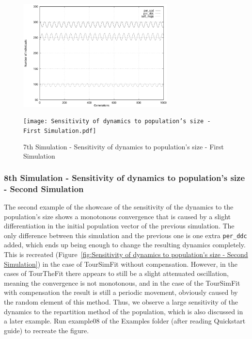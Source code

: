 	\begin{figure}[h]
	    \centering
		\includegraphics[width=0.7\textwidth]{RefPaperFigures/fig7a.jpeg}\par\vspace{0.5em}
	    \texttt{[image: Sensitivity of dynamics to population's size - First Simulation.pdf]}
	    \caption{7th Simulation - Sensitivity of dynamics to population's size - First Simulation}
	    \label{fig:Sensitivity of dynamics to population's size - First Simulation}
	\end{figure}
\subsubsection{8th Simulation - Sensitivity of dynamics to population's size - Second Simulation}
The second example of the showcase of the sensitivity of the dynamics to the population's size shows a monotonous convergence that is caused by a slight differentiation in the initial population vector of the previous simulation. The only difference between this simulation and the previous one is one extra \texttt{per\_ddc} added, which ends up being enough to change the resulting dynamics completely. This is recreated (Figure~\ref{fig:Sensitivity of dynamics to population's size - Second Simulation}) in the case of TourSimFit without compensation. However, in the cases of TourTheFit there appears to still be a slight attenuated oscillation, meaning the convergence is not monotonous, and in the case of the TourSimFit with compensation the result is still a periodic movement, obviously caused by the random element of this method. Thus, we observe a large sensitivity of the dynamics to the repartition method of the population, which is also discussed in a later example. Run example08 of the Examples folder (after reading Quickstart guide) to recreate the figure.


